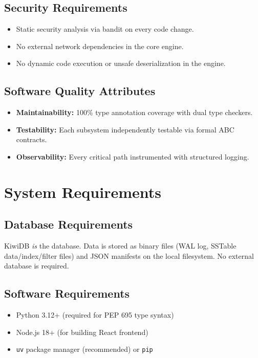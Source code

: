 \documentclass[oneside,a4paper,12pt]{book}
\begin{document}
\subsection{Security Requirements}
\begin{itemize}[leftmargin=2em]
    \item Static security analysis via bandit on every code change.
    \item No external network dependencies in the core engine.
    \item No dynamic code execution or unsafe deserialization in the engine.
\end{itemize}

\subsection{Software Quality Attributes}
\begin{itemize}[leftmargin=2em]
    \item \textbf{Maintainability:} 100\% type annotation coverage with dual type checkers.
    \item \textbf{Testability:} Each subsystem independently testable via formal ABC contracts.
    \item \textbf{Observability:} Every critical path instrumented with structured logging.
\end{itemize}

\section{System Requirements}

\subsection{Database Requirements}
KiwiDB \emph{is} the database. Data is stored as binary files (WAL log, SSTable data/index/filter files) and JSON manifests on the local filesystem. No external database is required.

\subsection{Software Requirements}
\begin{itemize}[leftmargin=2em]
    \item Python 3.12+ (required for PEP 695 type syntax)
    \item Node.js 18+ (for building React frontend)
    \item \texttt{uv} package manager (recommended) or \texttt{pip}
\end{itemize}
\end{document}
